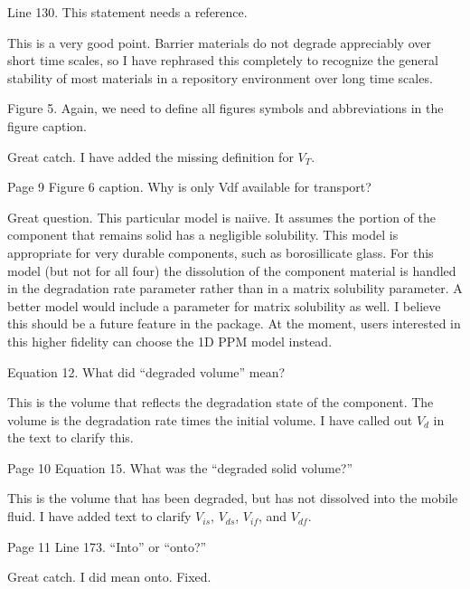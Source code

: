 \documentclass[answers,12pt]{exam}
\begin{document}
\begin{questions}
\question Line 130. This statement needs a reference.

\begin{solution}
This is a very good point. Barrier materials do not degrade appreciably over 
short time scales, so I have rephrased this completely to recognize the general 
stability of most materials in a repository environment over long time scales.  
\end{solution}

\question Figure 5. Again, we need to define all figures symbols and 
abbreviations in the figure caption.
\begin{solution}
Great catch. I have added the missing definition for $V_T$.  \end{solution}

\question Page 9 Figure 6 caption. Why is only Vdf available for transport?
\begin{solution}
Great question. This particular model is naiive. It assumes the portion of the 
        component that remains solid  has a negligible solubility. This model 
        is appropriate for very durable components, such as borosillicate 
        glass.  For this model (but not for all four) the dissolution of the 
        component material is handled in the degradation rate parameter rather 
        than in a matrix solubility parameter. A better model would include a 
        parameter for matrix solubility as well. I believe this should be a 
        future feature in the package. At the moment, users interested in this 
        higher fidelity can choose the 1D PPM model instead. 
\end{solution}

\question Equation 12. What did ``degraded volume'' mean?
\begin{solution}
This is the volume that reflects the degradation state of the component. The 
        volume is the degradation rate times the initial volume. I have called 
        out $V_d$ in the text to clarify this.
\end{solution}

\question Page 10 Equation 15. What was the ``degraded solid volume?''
\begin{solution}
        This is the volume that has been degraded, but has not dissolved into 
        the mobile fluid. I have added text to clarify
        $V_{is}$,  $V_{ds}$, $V_{if}$, and
        $V_{df}$.  \end{solution}
 

\question Page 11 Line 173. ``Into'' or ``onto?''
\begin{solution}
Great catch. I did mean onto. Fixed.
\end{solution}


\end{questions}
\end{document}
